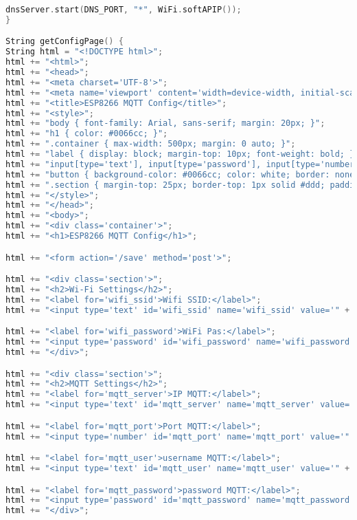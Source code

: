 \begin{lstlisting}[language=C++]
dnsServer.start(DNS_PORT, "*", WiFi.softAPIP());
}

String getConfigPage() {
String html = "<!DOCTYPE html>";
html += "<html>";
html += "<head>";
html += "<meta charset='UTF-8'>";
html += "<meta name='viewport' content='width=device-width, initial-scale=1.0'>";
html += "<title>ESP8266 MQTT Config</title>";
html += "<style>";
html += "body { font-family: Arial, sans-serif; margin: 20px; }";
html += "h1 { color: #0066cc; }";
html += ".container { max-width: 500px; margin: 0 auto; }";
html += "label { display: block; margin-top: 10px; font-weight: bold; }";
html += "input[type='text'], input[type='password'], input[type='number'] { width: 100%; padding: 8px; margin-top: 5px; box-sizing: border-box; }";
html += "button { background-color: #0066cc; color: white; border: none; padding: 10px 20px; margin-top: 20px; cursor: pointer; }";
html += ".section { margin-top: 25px; border-top: 1px solid #ddd; padding-top: 15px; }";
html += "</style>";
html += "</head>";
html += "<body>";
html += "<div class='container'>";
html += "<h1>ESP8266 MQTT Config</h1>";

html += "<form action='/save' method='post'>";

html += "<div class='section'>";
html += "<h2>Wi-Fi Settings</h2>";
html += "<label for='wifi_ssid'>Wifi SSID:</label>";
html += "<input type='text' id='wifi_ssid' name='wifi_ssid' value='" + String(config.wifi_ssid) + "' required>";

html += "<label for='wifi_password'>WiFi Pas:</label>";
html += "<input type='password' id='wifi_password' name='wifi_password' value='" + String(config.wifi_password) + "'>";
html += "</div>";

html += "<div class='section'>";
html += "<h2>MQTT Settings</h2>";
html += "<label for='mqtt_server'>IP MQTT:</label>";
html += "<input type='text' id='mqtt_server' name='mqtt_server' value='" + String(config.mqtt_server) + "' required>";

html += "<label for='mqtt_port'>Port MQTT:</label>";
html += "<input type='number' id='mqtt_port' name='mqtt_port' value='" + String(config.mqtt_port) + "' required>";

html += "<label for='mqtt_user'>username MQTT:</label>";
html += "<input type='text' id='mqtt_user' name='mqtt_user' value='" + String(config.mqtt_user) + "'>";

html += "<label for='mqtt_password'>password MQTT:</label>";
html += "<input type='password' id='mqtt_password' name='mqtt_password' value='" + String(config.mqtt_password) + "'>";
html += "</div>";


\end{lstlisting}
